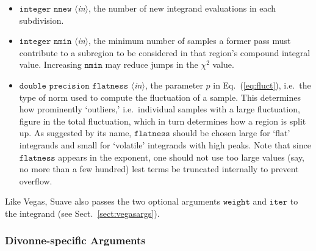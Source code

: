 \documentclass[12pt]{article}
\newcommand\ie{i.e.\ }
\newcommand\Code[1]{\ensuremath{\texttt{#1}}}
\newcommand\VarIn[1]{\item\Code{#1} \textit{$\langle$in\/$\rangle$},}
\begin{document}
\begin{itemize}
\VarIn{integer nnew}
the number of new integrand evaluations in each subdivision.

\VarIn{integer nmin}
the minimum number of samples a former pass must contribute to a 
subregion to be considered in that region's compound integral value.
Increasing \Code{nmin} may reduce jumps in the $\chi^2$ value.

\VarIn{double precision flatness}
the parameter $p$ in Eq.~(\ref{eq:fluct}), \ie the type of norm used to
compute the fluctuation of a sample.  This determines how prominently
`outliers,' \ie individual samples with a large fluctuation, figure in
the total fluctuation, which in turn determines how a region is split
up.  As suggested by its name, \Code{flatness} should be chosen large
for `flat' integrands and small for `volatile' integrands with high
peaks.  Note that since \Code{flatness} appears in the exponent, one
should not use too large values (say, no more than a few hundred) lest
terms be truncated internally to prevent overflow.
\end{itemize}

Like Vegas, Suave also passes the two optional arguments \Code{weight}
and \Code{iter} to the integrand (see Sect.~\ref{sect:vegasargs}).


\subsubsection{Divonne-specific Arguments}
\label{sect:divonneargs}
\end{document}
